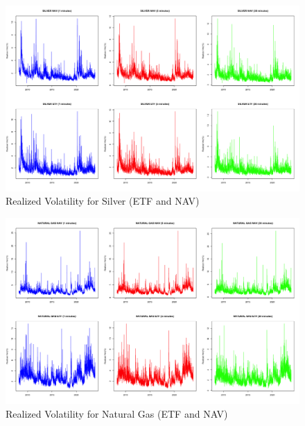 \begin{landscape}
\begin{figure}[t]
\includegraphics[width=16cm]{SLV.png}
\centering
\caption{Realized Volatility for Silver (ETF and NAV)}
\label{fig:rv_slv}
\end{figure}
\end{landscape}

\begin{landscape}
\begin{figure}[t]
\includegraphics[width=16cm]{UNG.png}
\centering
\caption{Realized Volatility for Natural Gas (ETF and NAV)}
\label{fig:rv_ung}
\end{figure}
\end{landscape}

